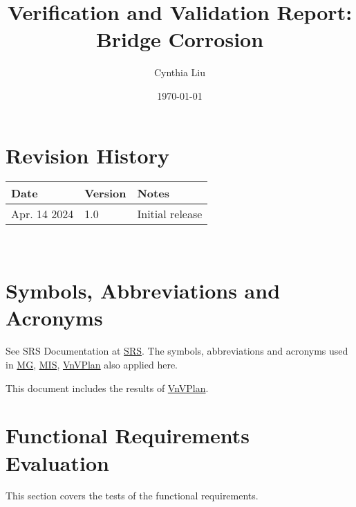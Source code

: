 \documentclass[12pt, titlepage]{article}
\begin{document}
\title{Verification and Validation Report: Bridge Corrosion} 
\author{Cynthia Liu}
\date{\today}
	
\maketitle


\section{Revision History}

\begin{tabularx}{\textwidth}{p{3cm}p{2cm}X}
\toprule {\bf Date} & {\bf Version} & {\bf Notes}\\
\midrule
Apr. 14 2024 & 1.0 & Initial release\\
\bottomrule
\end{tabularx}

~\newpage

\section{Symbols, Abbreviations and Acronyms}
See SRS Documentation at \href{https://github.com/CynthiaLiu0805/BridgeCorrosion/blob/main/docs/SRS/SRS.pdf}{SRS}.
The symbols, abbreviations and acronyms used in \href{https://github.com/CynthiaLiu0805/BridgeCorrosion/blob/main/docs/Design/SoftArchitecture/MG.pdf}{MG}, \href{https://github.com/CynthiaLiu0805/BridgeCorrosion/blob/main/docs/Design/SoftDetailedDes/MIS.pdf}{MIS}, \href{https://github.com/CynthiaLiu0805/BridgeCorrosion/blob/main/docs/VnVPlan/VnVPlan.pdf}{VnVPlan} also applied here.



\newpage

\tableofcontents

\listoftables %

\listoffigures %

\newpage


This document includes the results of \href{https://github.com/CynthiaLiu0805/BridgeCorrosion/blob/main/docs/VnVPlan/VnVPlan.pdf}{VnVPlan}. 

\section{Functional Requirements Evaluation}\label{FRE}
This section covers the tests of the functional requirements.
\end{document}
